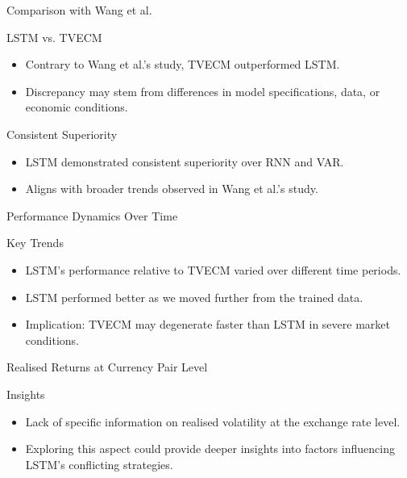 \documentclass{beamer}
\begin{document}
\begin{frame}{Comparison with Wang et al.}
    \begin{block}{LSTM vs. TVECM}
        \begin{itemize}
            \item Contrary to Wang et al.'s study, TVECM outperformed LSTM.
            \item Discrepancy may stem from differences in model specifications, data, or economic conditions.
        \end{itemize}
    \end{block}

    \begin{block}{Consistent Superiority}
        \begin{itemize}
            \item LSTM demonstrated consistent superiority over RNN and VAR.
            \item Aligns with broader trends observed in Wang et al.'s study.
        \end{itemize}
    \end{block}
\end{frame}

\begin{frame}{Performance Dynamics Over Time}
    \begin{block}{Key Trends}
        \begin{itemize}
            \item LSTM's performance relative to TVECM varied over different time periods.
            \item LSTM performed better as we moved further from the trained data.
            \item Implication: TVECM may degenerate faster than LSTM in severe market conditions.
        \end{itemize}
    \end{block}
\end{frame}

\begin{frame}{Realised Returns at Currency Pair Level}
    \begin{block}{Insights}
        \begin{itemize}
            \item Lack of specific information on realised volatility at the exchange rate level.
            \item Exploring this aspect could provide deeper insights into factors influencing LSTM's conflicting strategies.
        \end{itemize}
    \end{block}
\end{frame}
\end{document}
